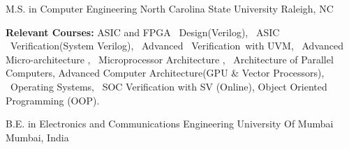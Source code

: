 \par\addvspace{0ex}


\begin{cventries}

  \cventry
    {M.S. in Computer Engineering} %
    {North Carolina State University} %
    {Raleigh, NC} %
    {\color{darkgray}{Aug. 2017 - Expected May. 2019}} %
    {
      \begin{cvitems} %
        \item \textbf{Relevant Courses:} {ASIC and FPGA \ Design(Verilog), \ ASIC \ Verification(System Verilog), \  Advanced \  Verification\ with  UVM, \  Advanced Micro-architecture , \ Microprocessor Architecture , \ Architecture of Parallel Computers,  Advanced Computer Architecture(GPU \& Vector Processors), \ Operating Systems, \  SOC Verification with SV (Online), Object Oriented Programming (OOP).}
      \end{cvitems}
    }
    \par\addvspace{-1ex}
    \cventry
    {B.E. in Electronics and Communications Engineering} %
    {University Of Mumbai} %
    {Mumbai, India} %
    {\color{darkgray}{Aug. 2013 - May.2017}} %
    {
    }

\end{cventries}
